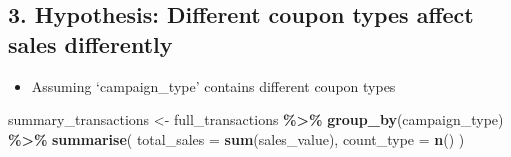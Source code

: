 \documentclass[
]{article}
\newenvironment{Shaded}{\begin{snugshade}}{\end{snugshade}}
\newcommand{\AttributeTok}[1]{\textcolor[rgb]{0.13,0.29,0.53}{#1}}
\newcommand{\FunctionTok}[1]{\textcolor[rgb]{0.13,0.29,0.53}{\textbf{#1}}}
\newcommand{\NormalTok}[1]{#1}
\newcommand{\OtherTok}[1]{\textcolor[rgb]{0.56,0.35,0.01}{#1}}
\newcommand{\SpecialCharTok}[1]{\textcolor[rgb]{0.81,0.36,0.00}{\textbf{#1}}}
\providecommand{\tightlist}{%
  \setlength{\itemsep}{0pt}\setlength{\parskip}{0pt}}
\begin{document}
\hypertarget{hypothesis-different-coupon-types-affect-sales-differently}{%
\subsection{3. Hypothesis: Different coupon types affect sales
differently}\label{hypothesis-different-coupon-types-affect-sales-differently}}

\begin{itemize}
\tightlist
\item
  Assuming `campaign\_type' contains different coupon types
\end{itemize}

\begin{Shaded}
\begin{Highlighting}[]
\NormalTok{summary\_transactions }\OtherTok{\textless{}{-}}\NormalTok{ full\_transactions }\SpecialCharTok{\%\textgreater{}\%}
  \FunctionTok{group\_by}\NormalTok{(campaign\_type) }\SpecialCharTok{\%\textgreater{}\%}
  \FunctionTok{summarise}\NormalTok{(}
    \AttributeTok{total\_sales =} \FunctionTok{sum}\NormalTok{(sales\_value),}
    \AttributeTok{count\_type =} \FunctionTok{n}\NormalTok{()}
\NormalTok{)}


\end{Highlighting}
\end{Shaded}
\end{document}
